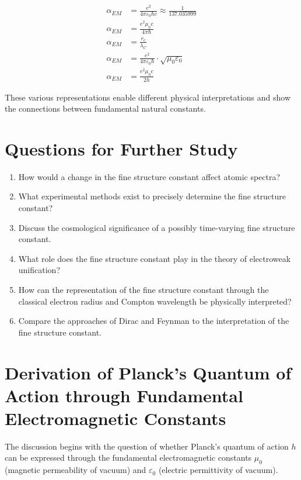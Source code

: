 \documentclass[12pt,a4paper]{article}
\begin{document}
	\begin{align}
		\alpha_{EM} &= \frac{e^2}{4\pi\varepsilon_0\hbar c} \approx \frac{1}{137.035999}\\
		\alpha_{EM} &= \frac{e^2\mu_0 c}{4\pi\hbar}\\
		\alpha_{EM} &= \frac{r_e}{\lambda_C}\\
		\alpha_{EM} &= \frac{e^2}{4\pi\varepsilon_0\hbar} \cdot \sqrt{\mu_0\varepsilon_0}\\
		\alpha_{EM} &= \frac{e^2\mu_0 c}{2h}
	\end{align}
	
	These various representations enable different physical interpretations and show the connections between fundamental natural constants.
	
	\section{Questions for Further Study}
	
	\begin{enumerate}
		\item How would a change in the fine structure constant affect atomic spectra?
		\item What experimental methods exist to precisely determine the fine structure constant?
		\item Discuss the cosmological significance of a possibly time-varying fine structure constant.
		\item What role does the fine structure constant play in the theory of electroweak unification?
		\item How can the representation of the fine structure constant through the classical electron radius and Compton wavelength be physically interpreted?
		\item Compare the approaches of Dirac and Feynman to the interpretation of the fine structure constant.
	\end{enumerate}
	
	\section{Derivation of Planck's Quantum of Action through Fundamental Electromagnetic Constants}
	
	The discussion begins with the question of whether Planck's quantum of action $h$ can be expressed through the fundamental electromagnetic constants $\mu_0$ (magnetic permeability of vacuum) and $\varepsilon_0$ (electric permittivity of vacuum).
	
\end{document}
